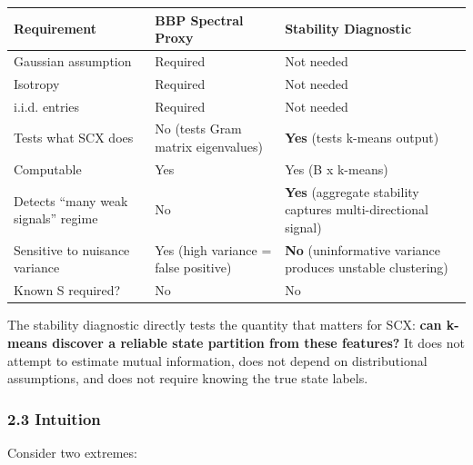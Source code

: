 \documentclass[
  12pt,
]{article}
\begin{document}
\begin{longtable}[]{@{}
  >{\raggedright\arraybackslash}p{}
  >{\raggedright\arraybackslash}p{}
  >{\raggedright\arraybackslash}p{}@{}}
\toprule\noalign{}
\begin{minipage}[b]{\linewidth}\raggedright
Requirement
\end{minipage} & \begin{minipage}[b]{\linewidth}\raggedright
BBP Spectral Proxy
\end{minipage} & \begin{minipage}[b]{\linewidth}\raggedright
Stability Diagnostic
\end{minipage} \\
\midrule\noalign{}
\endhead
\bottomrule\noalign{}
\endlastfoot
Gaussian assumption & Required & Not needed \\
Isotropy & Required & Not needed \\
i.i.d. entries & Required & Not needed \\
Tests what SCX does & No (tests Gram matrix eigenvalues) & \textbf{Yes}
(tests k-means output) \\
Computable & Yes & Yes (B x k-means) \\
Detects ``many weak signals'' regime & No & \textbf{Yes} (aggregate
stability captures multi-directional signal) \\
Sensitive to nuisance variance & Yes (high variance = false positive) &
\textbf{No} (uninformative variance produces unstable clustering) \\
Known S required? & No & No \\
\end{longtable}

The stability diagnostic directly tests the quantity that matters for
SCX: \textbf{can k-means discover a reliable state partition from these
features?} It does not attempt to estimate mutual information, does not
depend on distributional assumptions, and does not require knowing the
true state labels.

\subsubsection{2.3 Intuition}\label{intuition}

Consider two extremes:
\end{document}

